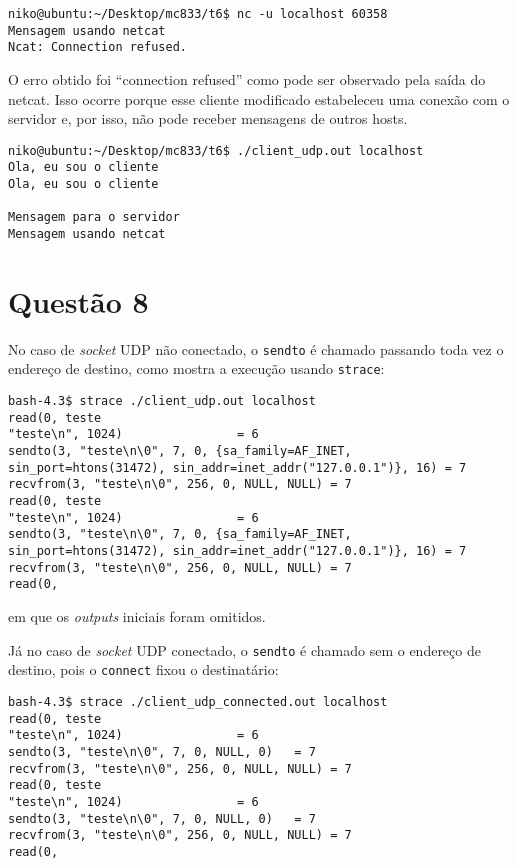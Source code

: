 \documentclass[a4paper,10pt]{article}
\begin{document}
\begin{lstlisting}
niko@ubuntu:~/Desktop/mc833/t6$ nc -u localhost 60358
Mensagem usando netcat
Ncat: Connection refused.

\end{lstlisting}

O erro obtido foi ``connection refused'' como pode ser observado pela saída do netcat. Isso ocorre porque esse cliente modificado estabeleceu uma conexão com o servidor e, por isso, não pode receber mensagens de outros hosts.

\begin{lstlisting}
niko@ubuntu:~/Desktop/mc833/t6$ ./client_udp.out localhost
Ola, eu sou o cliente
Ola, eu sou o cliente

Mensagem para o servidor
Mensagem usando netcat
\end{lstlisting}

\section{Questão 8}
No caso de \textit{socket} UDP não conectado, o {\tt sendto} é chamado passando toda vez o endereço de destino, como mostra a execução usando {\tt strace}:

\begin{lstlisting}
bash-4.3$ strace ./client_udp.out localhost
read(0, teste
"teste\n", 1024)                = 6
sendto(3, "teste\n\0", 7, 0, {sa_family=AF_INET, sin_port=htons(31472), sin_addr=inet_addr("127.0.0.1")}, 16) = 7
recvfrom(3, "teste\n\0", 256, 0, NULL, NULL) = 7
read(0, teste
"teste\n", 1024)                = 6
sendto(3, "teste\n\0", 7, 0, {sa_family=AF_INET, sin_port=htons(31472), sin_addr=inet_addr("127.0.0.1")}, 16) = 7
recvfrom(3, "teste\n\0", 256, 0, NULL, NULL) = 7
read(0, 

\end{lstlisting}

em que os \textit{outputs} iniciais foram omitidos.

Já no caso de \textit{socket} UDP conectado, o {\tt sendto} é chamado sem o endereço de destino, pois o {\tt connect} fixou o destinatário:

\begin{lstlisting}
bash-4.3$ strace ./client_udp_connected.out localhost
read(0, teste
"teste\n", 1024)                = 6
sendto(3, "teste\n\0", 7, 0, NULL, 0)   = 7
recvfrom(3, "teste\n\0", 256, 0, NULL, NULL) = 7
read(0, teste
"teste\n", 1024)                = 6
sendto(3, "teste\n\0", 7, 0, NULL, 0)   = 7
recvfrom(3, "teste\n\0", 256, 0, NULL, NULL) = 7
read(0, 

\end{lstlisting}
\end{document}
